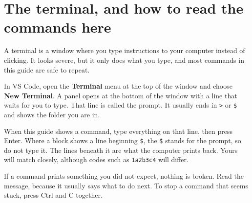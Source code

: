 \section{The terminal, and how to read the commands here}

A terminal is a window where you type instructions to your computer instead of clicking. It looks severe, but it only does what you type, and most commands in this guide are safe to repeat.

In VS Code, open the \textbf{Terminal} menu at the top of the window and choose \textbf{New Terminal}. A panel opens at the bottom of the window with a line that waits for you to type. That line is called the prompt. It usually ends in \texttt{>} or \texttt{\$} and shows the folder you are in.

When this guide shows a command, type everything on that line, then press Enter. Where a block shows a line beginning \texttt{\$}, the \texttt{\$} stands for the prompt, so do not type it. The lines beneath it are what the computer prints back. Yours will match closely, although codes such as \texttt{1a2b3c4} will differ.

If a command prints something you did not expect, nothing is broken. Read the message, because it usually says what to do next. To stop a command that seems stuck, press Ctrl and C together.
